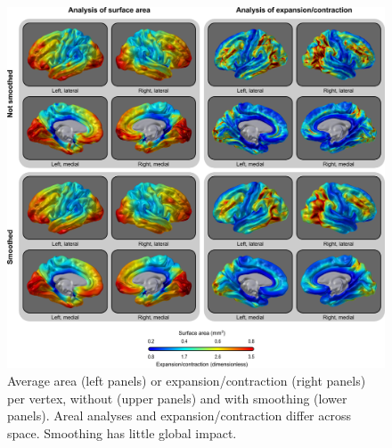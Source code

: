 \begin{figure}[!tp]  %
\centering
\includegraphics[width=14cm]{images/expansion.png}
\caption[Comparison with expansion/contraction methods (\textsc{i}).]{Average area (left panels) or expansion/contraction (right panels) per vertex, without (upper panels) and with smoothing (lower panels). Areal analyses and expansion/contraction differ across space. Smoothing has little global impact.}
\label{fig:expansion}
\end{figure}

